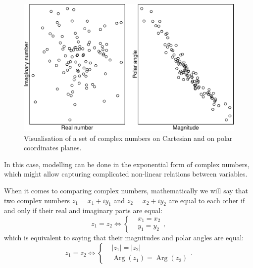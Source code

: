 \documentclass[
]{book}
\DeclareMathOperator\Arg{Arg}
\begin{document}
\begin{figure}
\centering
\includegraphics{Svetunkov---Svetunkov---Complex-Dynamic-Models_files/figure-latex/complexCartesianvsPolar-1.pdf}
\caption{\label{fig:complexCartesianvsPolar}Visualisation of a set of complex numbers on Cartesian and on polar coordinates planes.}
\end{figure}

In this case, modelling can be done in the exponential form of complex numbers, which might allow capturing complicated non-linear relations between variables.

When it comes to comparing complex numbers, mathematically we will say that two complex numbers \(z_1 = x_1 + i y_1\) and \(z_2 = x_2 + i y_2\) are equal to each other if and only if their real and imaginary parts are equal:
\begin{equation*}
    z_1 = z_2 \iff \left \lbrace
    \begin{aligned}
        & x_1 = x_2 \\
        & y_1 = y_2
    \end{aligned}
    \right. ,
\end{equation*}
which is equivalent to saying that their magnitudes and polar angles are equal:
\begin{equation*}
    z_1 = z_2 \iff \left \lbrace
    \begin{aligned}
        & |z_1| = |z_2| \\
        & \Arg(z_1) = \Arg(z_2)
    \end{aligned}
    \right. .
\end{equation*}
\end{document}
